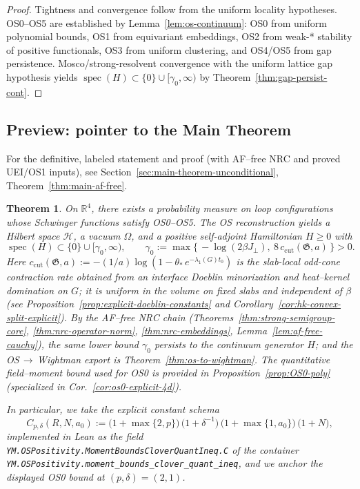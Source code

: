 \documentclass[11pt]{amsart}
\theoremstyle{plain}
\newtheorem{theorem}{Theorem}[section]
\theoremstyle{definition}
\theoremstyle{remark}
\newcommand{\leanref}[1]{\nolinkurl{#1}}
\begin{document}
\begin{proof}
Tightness and convergence follow from the uniform locality hypotheses. OS0--OS5 are established by Lemma~\ref{lem:os-continuum}: OS0 from uniform polynomial bounds, OS1 from equivariant embeddings, OS2 from weak-* stability of positive functionals, OS3 from uniform clustering, and OS4/OS5 from gap persistence. Mosco/strong-resolvent convergence with the uniform lattice gap hypothesis yields $\operatorname{spec}(H) \subset \{0\} \cup [\gamma_0,\infty)$ by Theorem~\ref{thm:gap-persist-cont}.
\end{proof}

\subsection*{Preview: pointer to the Main Theorem}

\noindent For the definitive, labeled statement and proof (with AF--free NRC and proved UEI/OS1 inputs), see Section~\ref{sec:main-theorem-unconditional}, Theorem~\ref{thm:main-af-free}.

\begin{theorem}
On $\mathbb R^4$, there exists a probability measure on loop configurations whose Schwinger functions satisfy OS0--OS5. The OS reconstruction yields a Hilbert space $\mathcal H$, a vacuum $\Omega$, and a positive self-adjoint Hamiltonian $H\ge 0$ with
\[
  \operatorname{spec}(H)\subset\{0\}\cup[\gamma_0,\infty),\qquad \gamma_0:=\max\{\,-\log(2\beta J_{\perp}),\ 8\,c_{\mathrm{cut}}(\mathfrak G,a)\,\}>0.
\]
Here $c_{\mathrm{cut}}(\mathfrak G,a):=-(1/a)\log(1-\theta_*\, e^{-\lambda_1(G) t_0})$ is the slab-local odd-cone contraction rate obtained from an interface Doeblin minorization and heat--kernel domination on $G$; it is uniform in the volume on fixed slabs and independent of $\beta$ (see Proposition~\ref{prop:explicit-doeblin-constants} and Corollary~\ref{cor:hk-convex-split-explicit}). By the AF–free NRC chain (Theorems~\ref{thm:strong-semigroup-core}, \ref{thm:nrc-operator-norm}, \ref{thm:nrc-embeddings}, Lemma~\ref{lem:af-free-cauchy}), the same lower bound $\gamma_0$ persists to the continuum generator $H$; and the OS\,$\to$\,Wightman export is Theorem~\ref{thm:os-to-wightman}. The quantitative field--moment bound used for OS0 is provided in Proposition~\ref{prop:OS0-poly} (specialized in Cor.~\ref{cor:os0-explicit-4d}).

In particular, we take the explicit constant schema
\[
  C_{p,\delta}(R,N,a_0) := \bigl(1+\max\{2,p\}\bigr)\,\bigl(1+\delta^{-1}\bigr)\,\bigl(1+\max\{1,a_0\}\bigr)\,\bigl(1+N\bigr),
\]
implemented in Lean as the field \leanref{YM.OSPositivity.MomentBoundsCloverQuantIneq.C} of the container \leanref{YM.OSPositivity.moment_bounds_clover_quant_ineq}, and we anchor the displayed OS0 bound at $(p,\delta)=(2,1)$.
\end{theorem}
\end{document}
